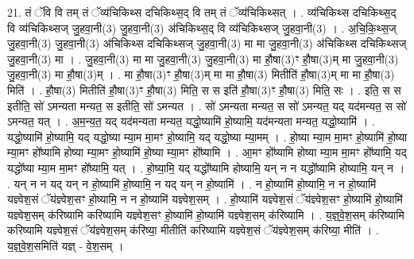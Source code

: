 \documentclass[17pt]{extarticle}
\begin{document}
21. तं ॅवि वि तम् तं ॅव्य॑चिकिथ्स दचिकिथ्स॒द् वि तम् तं ॅव्य॑चिकिथ्सत् । . व्य॑चिकिथ्स दचिकिथ्स॒द् वि व्य॑चिकिथ्सज् जु॒हवा॒नी(3) जु॒हवा॒नी(3) अ॑चिकिथ्स॒द् वि व्य॑चिकिथ्सज् जु॒हवा॒नी(3) । . अ॒चि॒कि॒थ्स॒ज् जु॒हवा॒नी(3) जु॒हवा॒नी(3) अ॑चिकिथ्स दचिकिथ्सज् जु॒हवा॒नी(3) मा मा जु॒हवा॒नी(3) अ॑चिकिथ्स दचिकिथ्सज् जु॒हवा॒नी(3) मा । . जु॒हवा॒नी(3) मा मा जु॒हवा॒नी(3) जु॒हवा॒नी(3) मा हौ॒षा(3)ꣳ हौ॒षा(3)म् मा जु॒हवा॒नी(3) जु॒हवा॒नी(3) मा हौ॒षा(3)म् । . मा हौ॒षा(3)ꣳ हौ॒षा(3)म् मा मा हौ॒षा(3) मितीति॑ हौ॒षा(3)म् मा मा हौ॒षा(3) मिति॑ । . हौ॒षा(3) मितीति॑ हौ॒षा(3)ꣳ हौ॒षा(3) मिति॒ स स इति॑ हौ॒षा(3)ꣳ हौ॒षा(3) मिति॒ सः । . इति॒ स स इतीति॒ सो॑ ऽमन्यता मन्यत॒ स इतीति॒ सो॑ ऽमन्यत । . सो॑ ऽमन्यता मन्यत॒ स सो॑ ऽमन्यत॒ यद् यद॑मन्यत॒ स सो॑ ऽमन्यत॒ यत् । . अ॒म॒न्य॒त॒ यद् यद॑मन्यता मन्यत॒ यद्धो॒ष्यामि॑ हो॒ष्यामि॒ यद॑मन्यता मन्यत॒ यद्धो॒ष्यामि॑ । . यद्धो॒ष्यामि॑ हो॒ष्यामि॒ यद् यद्धो॒ष्या म्या॒म मा॒मꣳ हो॒ष्यामि॒ यद् यद्धो॒ष्या म्या॒मम् । . हो॒ष्या म्या॒म मा॒मꣳ हो॒ष्यामि॑ हो॒ष्या म्या॒मꣳ हो᳚ष्यामि होष्या म्या॒मꣳ हो॒ष्यामि॑ हो॒ष्या म्या॒मꣳ हो᳚ष्यामि । . आ॒मꣳ हो᳚ष्यामि होष्या म्या॒म मा॒मꣳ हो᳚ष्यामि॒ यद् यद्धो᳚ष्या म्या॒म मा॒मꣳ हो᳚ष्यामि॒ यत् । . हो॒ष्या॒मि॒ यद् यद्धो᳚ष्यामि होष्यामि॒ यन् न न यद्धो᳚ष्यामि होष्यामि॒ यन् न । . यन् न न यद् यन् न हो॒ष्यामि॑ हो॒ष्यामि॒ न यद् यन् न हो॒ष्यामि॑ । . न हो॒ष्यामि॑ हो॒ष्यामि॒ न न हो॒ष्यामि॑ यज्ञ्वेश॒सं ॅय॑ज्ञ्वेश॒सꣳ हो॒ष्यामि॒ न न हो॒ष्यामि॑ यज्ञ्वेश॒सम् । . हो॒ष्यामि॑ यज्ञ्वेश॒सं ॅय॑ज्ञ्वेश॒सꣳ हो॒ष्यामि॑ हो॒ष्यामि॑ यज्ञ्वेश॒सम् क॑रिष्यामि करिष्यामि यज्ञ्वेश॒सꣳ हो॒ष्यामि॑ हो॒ष्यामि॑ यज्ञ्वेश॒सम् क॑रिष्यामि । . य॒ज्ञ्॒वे॒श॒सम् क॑रिष्यामि करिष्यामि यज्ञ्वेश॒सं ॅय॑ज्ञ्वेश॒सम् क॑रिष्या॒ मीतीति॑ करिष्यामि यज्ञ्वेश॒सं ॅय॑ज्ञ्वेश॒सम् क॑रिष्या॒ मीति॑ । . य॒ज्ञ्॒वे॒श॒समिति॑ यज्ञ् - वे॒श॒सम् । \newline
\end{document}
